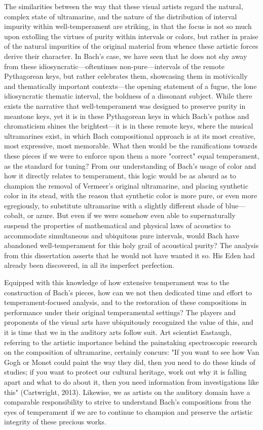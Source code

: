 The similarities between the way that these visual artists regard the
natural, complex state of ultramarine, and the nature of the
distribution of interval impurity within well-temperament are striking,
in that the focus is not so much upon extolling the virtues of purity
within intervals or colors, but rather in praise of the natural
impurities of the original material from whence these artistic forces
derive their character. In Bach's case, we have seen that he does not
shy away from these idiosyncratic---oftentimes
non-pure---intervals of the remote Pythagorean keys, but rather
celebrates them, showcasing them in motivically and thematically
important contexts---the opening statement of a fugue, the lone
idiosyncratic thematic interval, the boldness of a dissonant subject.
While there exists the narrative that well-temperament was designed to
preserve purity in meantone keys, yet it is in these Pythagorean keys in
which Bach's pathos and chromaticism shines the brightest---it is in
these remote keys, where the musical ultramarines exist, in which Bach
compositional approach is at its most creative, most expressive, most
memorable. What then would be the ramifications towards these pieces if
we were to enforce upon them a more "correct" equal temperament, as the
standard for tuning? From our understanding of Bach's usage of color and
how it directly relates to temperament, this logic would be as absurd as
to champion the removal of Vermeer's original ultramarine, and placing
synthetic color in its stead, with the reason that synthetic color is
more pure, or even more egregiously, to substitute ultramarine with a
slightly different shade of blue---cobalt, or azure. But even if we
were somehow even able to supernaturally suspend the properties of
mathematical and physical laws of acoustics to accommodate simultaneous
and ubiquitous pure intervals, would Bach have abandoned
well-temperament for this holy grail of acoustical purity? The analysis
from this dissertation asserts that he would not have wanted it so. His
Eden had already been discovered, in all its imperfect perfection.

Equipped with this knowledge of how extensive temperament was to the
construction of Bach's pieces, how can we not then dedicated time and
effort to temperament-focused analysis, and to the restoration of these
compositions in performance under their original temperamental settings?
The players and proponents of the visual arts have ubiquitously
recognized the value of this, and it is time that we in the auditory
arts follow suit. Art scientist Eastaugh, referring to the artistic
importance behind the painstaking spectroscopic research on the
composition of ultramarine, certainly concurs: "If you want to see how
Van Gogh or Monet could paint the way they did, then you need to do
these kinds of studies; if you want to protect our cultural heritage,
work out why it is falling apart and what to do about it, then you need
information from investigations like this" (Cartwright, 2013). Likewise,
we as artists on the auditory domain have a comparable responsibility to
strive to understand Bach's compositions from the eyes of temperament if
we are to continue to champion and preserve the artistic integrity of
these precious works.

